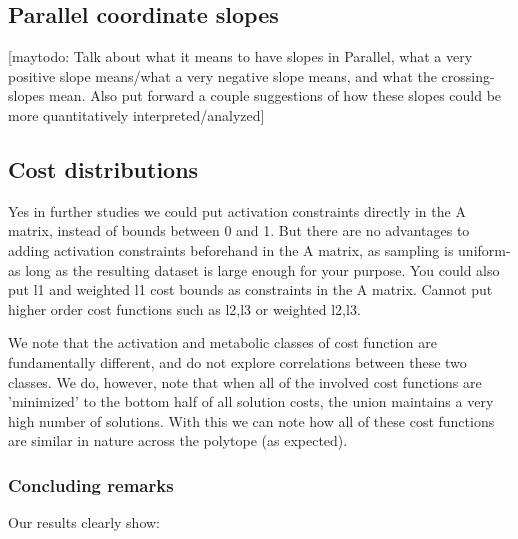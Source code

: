 \subsection{Parallel coordinate slopes} %
\label{sec:parallel_coordinate_slopes}
[maytodo: Talk about what it means to have slopes in Parallel, what a very positive slope means/what a very negative slope means, and what the crossing-slopes mean. Also put forward a couple suggestions of how these slopes could be more quantitatively interpreted/analyzed]

\subsection{Cost distributions} %
\label{sec:cost_distributions}
Yes in further studies we could put activation constraints directly in the A matrix, instead of bounds between 0 and 1. But there are no advantages to adding activation constraints beforehand in the A matrix, as sampling is uniform- as long as the resulting dataset is large enough for your purpose.
You could also put l1 and weighted l1 cost bounds as constraints in the A matrix. Cannot put higher order cost functions such as l2,l3 or weighted l2,l3.

We note that the activation and metabolic classes of cost function are fundamentally different, and do not explore correlations between these two classes. We do, however, note that when all of the involved cost functions are 'minimized' to the bottom half of all solution costs, the union maintains a very high number of solutions. With this we can note how all of these cost functions are similar in nature across the polytope (as expected).

\subsubsection{Concluding remarks} %
\label{ssub:concluding_remarks}

Our results clearly show:\\

